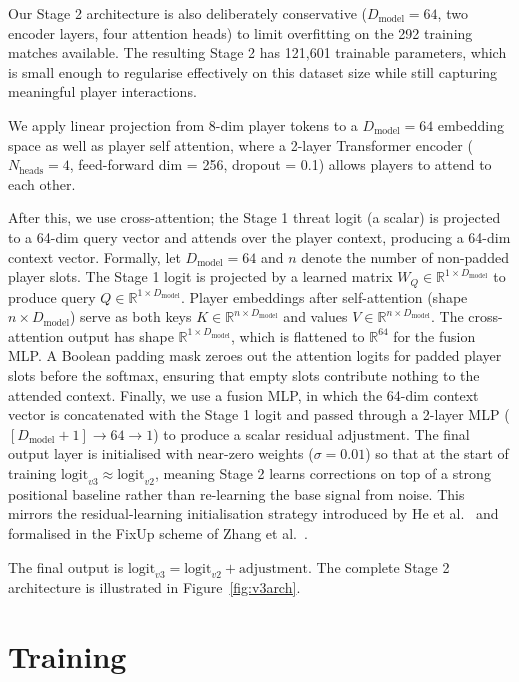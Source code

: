 Our Stage 2 architecture is also deliberately conservative ($D_\text{model} = 64$, two encoder layers, four attention heads) to limit overfitting on the 292 training matches available. The resulting Stage 2 has 121,601 trainable parameters, which is small enough to regularise effectively on this dataset size while still capturing meaningful player interactions.

We apply linear projection from 8-dim player tokens to a $D_\text{model} = 64$ embedding space as well as player self attention, where a 2-layer Transformer encoder ($N_\text{heads} = 4$, feed-forward dim = 256, dropout = 0.1) allows players to attend to each other.

After this, we use cross-attention; the Stage 1 threat logit (a scalar) is projected to a 64-dim query vector and attends over the player context, producing a 64-dim context vector. Formally, let $D_\text{model} = 64$ and $n$ denote the number of non-padded player slots. The Stage 1 logit is projected by a learned matrix $W_Q \in \mathbb{R}^{1 \times D_\text{model}}$ to produce query $Q \in \mathbb{R}^{1 \times D_\text{model}}$. Player embeddings after self-attention (shape $n \times D_\text{model}$) serve as both keys $K \in \mathbb{R}^{n \times D_\text{model}}$ and values $V \in \mathbb{R}^{n \times D_\text{model}}$. The cross-attention output has shape $\mathbb{R}^{1 \times D_\text{model}}$, which is flattened to $\mathbb{R}^{64}$ for the fusion MLP. A Boolean padding mask zeroes out the attention logits for padded player slots before the softmax, ensuring that empty slots contribute nothing to the attended context.
Finally, we use a fusion MLP, in which the 64-dim context vector is concatenated with the Stage 1 logit and passed through a 2-layer MLP ($[D_\text{model}{+}1] \to 64 \to 1$) to produce a scalar residual adjustment. The final output layer is initialised with near-zero weights ($\sigma = 0.01$) so that at the start of training $\text{logit}_{v3} \approx \text{logit}_{v2}$, meaning Stage 2 learns corrections on top of a strong positional baseline rather than re-learning the base signal from noise. This mirrors the residual-learning initialisation strategy introduced by He et al.~\cite{he2016deep} and formalised in the FixUp scheme of Zhang et al.~\cite{zhang2019fixup}.

The final output is $\text{logit}_{v3} = \text{logit}_{v2} + \text{adjustment}$. The complete Stage 2 architecture is illustrated in Figure~\ref{fig:v3arch}.

\section{Training}

